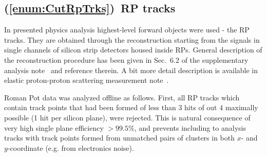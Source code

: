 \subsection{(\ref{enum:CutRpTrks})~RP tracks}\label{sec:C4}

In presented physics analysis highest-level forward objects were used - the RP tracks. They are obtained through the reconstruction starting from the signals in single channels of silicon strip detectors housed inside RPs. General description of the reconstruction procedure has been given in Sec.~6.2 of the supplementary analysis note~\cite{supplementaryNote} and reference therein. A bit more detail description is available in elastic proton-proton scattering measurement note~\cite{elasticNote}.


Roman Pot data was analyzed offline as follows. First, all RP tracks which contain track points that had been formed of less than 3 hits of out 4 maximally possible (1 hit per silicon plane), were rejected. This is natural consequence of very high single plane efficiency $>99.5\%$, and prevents including to analysis tracks with track points formed from unmatched pairs of clusters in both $x$- and $y$-coordinate (e.g. from electronics noise).

